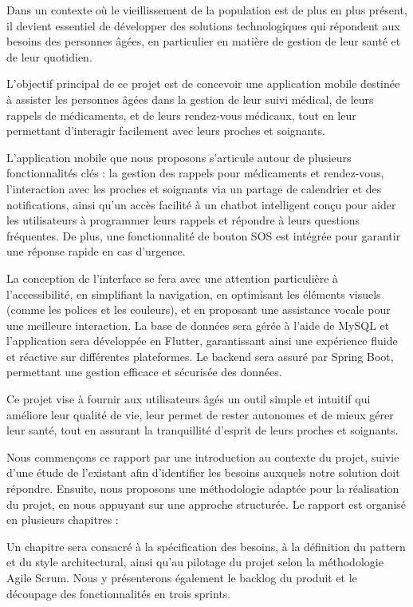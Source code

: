 \documentclass[12pt,a4paper]{report}
\begin{document}
Dans un contexte où le vieillissement de la population est de plus en plus présent, il devient essentiel de développer des solutions technologiques qui répondent aux besoins des personnes âgées, en particulier en matière de gestion de leur santé et de leur quotidien.

L'objectif principal de ce projet est de concevoir une application mobile destinée à assister les personnes âgées dans la gestion de leur suivi médical, de leurs rappels de médicaments, et de leurs rendez-vous médicaux, tout en leur permettant d'interagir facilement avec leurs proches et soignants.

L’application mobile que nous proposons s’articule autour de plusieurs fonctionnalités clés : la gestion des rappels pour médicaments et rendez-vous, l’interaction avec les proches et soignants via un partage de calendrier et des notifications, ainsi qu'un accès facilité à un chatbot intelligent conçu pour aider les utilisateurs à programmer leurs rappels et répondre à leurs questions fréquentes. De plus, une fonctionnalité de bouton SOS est intégrée pour garantir une réponse rapide en cas d’urgence.

La conception de l’interface se fera avec une attention particulière à l’accessibilité, en simplifiant la navigation, en optimisant les éléments visuels (comme les polices et les couleurs), et en proposant une assistance vocale pour une meilleure interaction. La base de données sera gérée à l’aide de MySQL et l’application sera développée en Flutter, garantissant ainsi une expérience fluide et réactive sur différentes plateformes. Le backend sera assuré par Spring Boot, permettant une gestion efficace et sécurisée des données.

Ce projet vise à fournir aux utilisateurs âgés un outil simple et intuitif qui améliore leur qualité de vie, leur permet de rester autonomes et de mieux gérer leur santé, tout en assurant la tranquillité d’esprit de leurs proches et soignants.

Nous commençons ce rapport par une introduction au contexte du projet, suivie d’une étude de l’existant afin d’identifier les besoins auxquels notre solution doit répondre. Ensuite, nous proposons une méthodologie adaptée pour la réalisation du projet, en nous appuyant sur une approche structurée. Le rapport est organisé en plusieurs chapitres :

Un chapitre sera consacré à la spécification des besoins, à la définition du pattern et du style architectural, ainsi qu’au pilotage du projet selon la méthodologie Agile Scrum. Nous y présenterons également le backlog du produit et le découpage des fonctionnalités en trois sprints.
\end{document}
